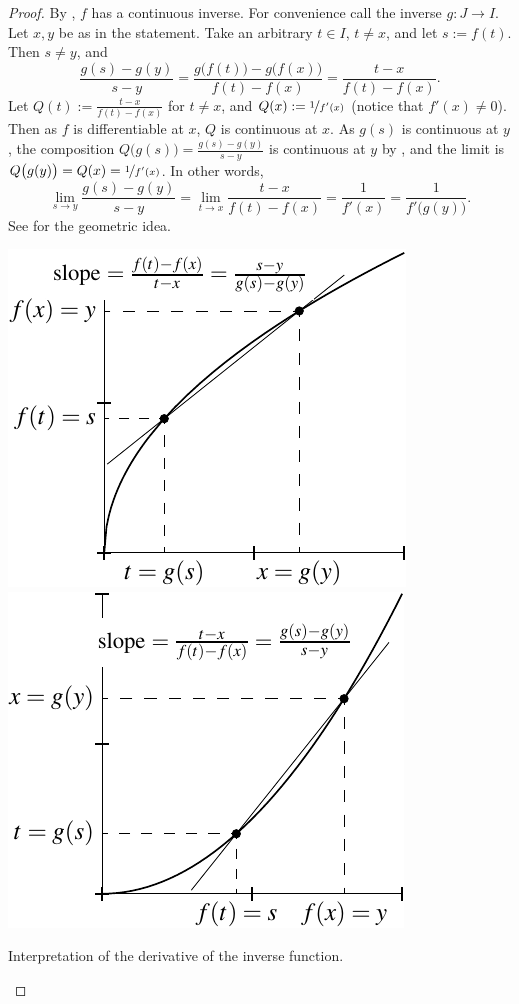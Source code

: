\begin{proof}
By , $f$ has a continuous inverse.  For convenience
call the inverse $g \colon J \to I$.
Let $x,y$ be as in the statement.  Take an arbitrary $t \in I$, $t \not= x$, 
and let $s := f(t)$.  Then $s \not= y$, and
\begin{equation*}
\frac{g(s)-g(y)}{s-y} =
\frac{g\bigl(f(t)\bigr)-g\bigl(f(x)\bigr)}{f(t)-f(x)} =
\frac{t-x}{f(t)-f(x)} .
\end{equation*}
Let $Q(t) := \frac{t-x}{f(t)-f(x)}$ for $t \neq x$, and
$Q(x) := \nicefrac{1}{f'(x)}$ (notice that $f'(x) \neq 0$).
Then as $f$ is differentiable at $x$, $Q$ is continuous at $x$.
As $g(s)$ is continuous at $y$,
the composition $Q\bigl(g(s)\bigr) = \frac{g(s)-g(y)}{s-y}$
is continuous at $y$ by
, and the limit is
$Q\bigl(g(y)\bigr) = Q(x) = \nicefrac{1}{f'(x)}$.
In other words,
\begin{equation*}
\lim_{s \to y}
\frac{g(s)-g(y)}{s-y} 
=
\lim_{t \to x}
\frac{t-x}{f(t)-f(x)} 
=
\frac{1}{f'(x)} 
=
\frac{1}{f'\bigl(g(y)\bigr)} .
\end{equation*}
See  for the geometric idea.
\begin{myfigureht}
\includegraphics{figures/inversefigA}
\quad
\includegraphics{figures/inversefigB}
\caption{Interpretation of the derivative of the inverse
function.\label{inversefig}}
\end{myfigureht}


\end{proof}
